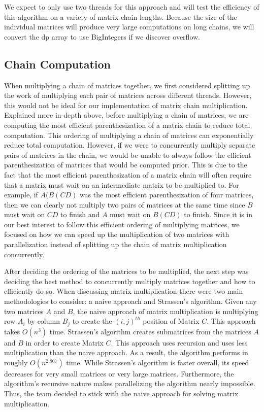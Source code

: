 \documentclass[conference,leqno]{IEEEtran}
\begin{document}
We expect to only use two threads for this approach and will test the efficiency of this algorithm on a variety of matrix chain lengths. Because the size of the individual matrices will produce very large computations on long chains, we will convert the dp array to use BigIntegers if we discover overflow.

\subsection{Chain Computation}
When multiplying a chain of matrices together, we first considered splitting up the work of multiplying each pair of matrices across different threads. However, this would not be ideal for our implementation of matrix chain multiplication. Explained more in-depth above, before multiplying a chain of matrices, we are computing the most efficient parenthesization of a matrix chain to reduce total computation. This ordering of multiplying a chain of matrices can exponentially reduce total computation. However, if we were to concurrently multiply separate pairs of matrices in the chain, we would be unable to always follow the efficient parenthesization of matrices that would be computed prior. This is due to the fact that the most efficient parenthesization of a matrix chain will often require that a matrix must wait on an intermediate matrix to be multiplied to. For example, if $A(B(CD)$ was the most efficient parenthesization of four matrices, then we can clearly not multiply two pairs of matrices at the same time since $B$ must wait on $CD$ to finish and $A$ must wait on $B(CD)$ to finish. Since it is in our best interest to follow this efficient ordering of multiplying matrices, we focused on how we can speed up the multiplication of two matrices with parallelization instead of splitting up the chain of matrix multiplication concurrently.

After deciding the ordering of the matrices to be multiplied, the next step was deciding the best method to concurrently multiply matrices together and how to efficiently do so. When discussing matrix multiplication there were two main methodologies to consider: a naive approach and Strassen’s algorithm. Given any two matrices $A$ and $B$, the naive approach of matrix multiplication is multiplying row $A_i$ by column $B_j$ to create the $(i, j)^{th}$ position of Matrix $C$. This approach takes $O(n^3)$ time. Strassen’s algorithm creates submatrices from the matrices $A$ and $B$ in order to create Matrix $C$. This approach uses recursion and uses less multiplication than the naive approach. As a result, the algorithm performs in roughly $O(n^2.807)$ time. While Strassen’s algorithm is faster overall, its speed decreases for very small matrices or very large matrices. Furthermore, the algorithm’s recursive nature makes parallelizing the algorithm nearly impossible. Thus, the team decided to stick with the naive approach for solving matrix multiplication.
\end{document}
